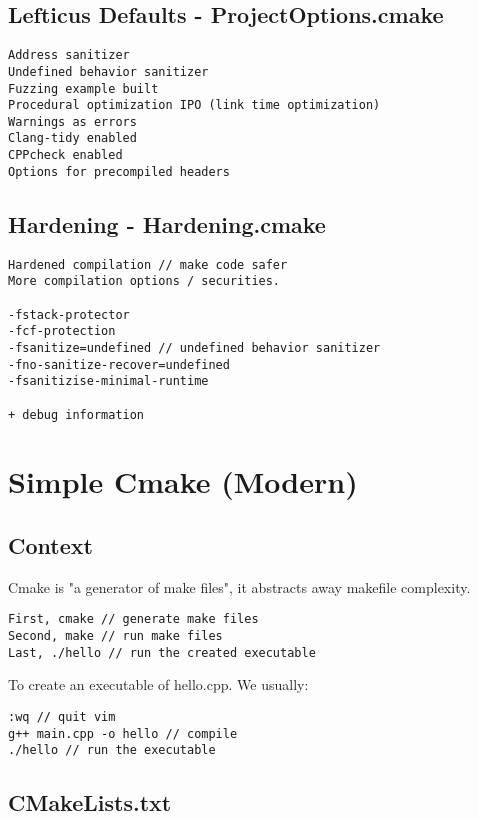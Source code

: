 \subsection{Lefticus Defaults - ProjectOptions.cmake}

\begin{verbatim}
Address sanitizer
Undefined behavior sanitizer
Fuzzing example built
Procedural optimization IPO (link time optimization)
Warnings as errors
Clang-tidy enabled
CPPcheck enabled
Options for precompiled headers
\end{verbatim}

\subsection{Hardening - Hardening.cmake}

\begin{verbatim}
Hardened compilation // make code safer
More compilation options / securities.

-fstack-protector
-fcf-protection
-fsanitize=undefined // undefined behavior sanitizer
-fno-sanitize-recover=undefined
-fsanitizise-minimal-runtime

+ debug information 
\end{verbatim}

\section{Simple Cmake (Modern)}

\subsection{Context}

Cmake is "a generator of make files", it abstracts away makefile complexity.

\begin{verbatim}
First, cmake // generate make files
Second, make // run make files
Last, ./hello // run the created executable
\end{verbatim}

To create an executable of hello.cpp. We usually:
\begin{verbatim}
:wq // quit vim
g++ main.cpp -o hello // compile 
./hello // run the executable
\end{verbatim}

\subsection{CMakeLists.txt}

